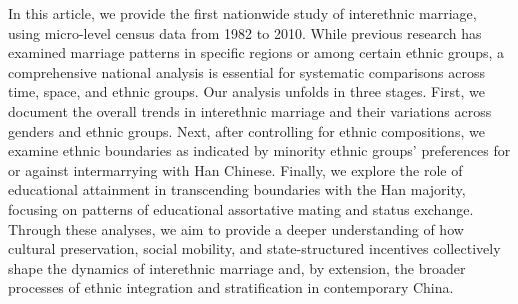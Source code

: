 In this article, we provide the first nationwide study of interethnic
marriage, using micro-level census data from 1982 to 2010.
While previous research has examined marriage patterns in specific regions or
among certain ethnic groups, a comprehensive national analysis is essential for
systematic comparisons across time, space, and ethnic groups.
Our analysis unfolds in three stages.
First, we document the overall trends in interethnic marriage and their
variations across genders and ethnic groups.
Next, after controlling for ethnic compositions, we examine ethnic boundaries
as indicated by minority ethnic groups' preferences for or against intermarrying
with Han Chinese.
Finally, we explore the role of educational attainment in transcending
boundaries with the Han majority, focusing on patterns of educational
assortative mating and status exchange.
Through these analyses, we aim to provide a deeper understanding of how cultural
preservation, social mobility, and state-structured incentives collectively
shape the dynamics of interethnic marriage and, by extension, the broader
processes of ethnic integration and stratification in contemporary China.